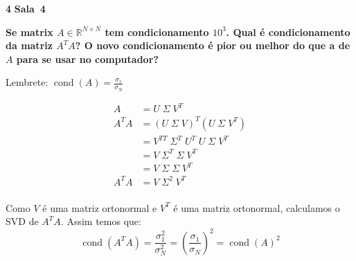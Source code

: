 \documentclass{article}
\newcommand{\R}{\mathbb{R}}
\DeclareMathOperator*{\cond}{cond}
\newenvironment{question}
    {\medskip\bfseries\large}
    {\medskip}
\newcounter{exe-list}
\newenvironment{exe}[2][Sala]
    {\bigskip\noindent\par\ifthenelse{\equal{#1}{}}%
        {\textbf{\LARGE #2}}%
        {\textbf{\LARGE #1~#2}}%
    \medskip\noindent\par}
    {\bigskip}
\begin{document}
\begin{exe}{4}
    \begin{question}
        Se matrix \(A \in \R^{N \times N}\)
        tem condicionamento \(10^3\).
        Qual é condicionamento da matriz \(A^T A\)?
        O novo condicionamento é pior ou melhor
        do que a de \(A\) para se usar no computador?

        \medskip

        Lembrete: \(\cond(A) = \frac{\sigma_1}{\sigma_N}\)
    \end{question}

    \begin{align*}
        A &= U \; \Sigma \; V^T \\
        A^T A &= (U \; \Sigma \; V)^T (U \; \Sigma \; V^T) \\
        &= V^{TT} \; \Sigma^T \; U^T \; U \; \Sigma \; V^T \\
        &= V \; \Sigma^T \; \Sigma \; V^T \\
        &= V \; \Sigma \; \Sigma \; V^T \\
        A^T A &= V \; \Sigma^2 \; V^T \\
    \end{align*}

    Como \(V\) é uma matriz ortonormal e
    \(V^T\) é uma matriz ortonormal,
    calculamos o SVD de \(A^T A\).
    Assim temos que:
    \[
        \cond(A^T A) = \frac{\sigma_1^2}{\sigma_N^2}
            = \left(\frac{\sigma_1}{\sigma_N}\right)^2
            = \cond(A)^2
    \]
\end{exe}
\end{document}
